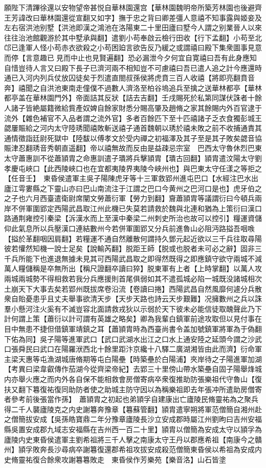 願陛下清蹕徐還以安物望帝甚悦自華林園還宫【華林園魏明帝所築芳林園也後避齊王芳諱改曰華林園還從宣翻又如字】撫于忠之背曰卿差彊人意禧不知事露與姬妾及左右宿洪池别墅【洪池即漢之鴻池在洛陽東二十里田廬曰墅今人謂之别業晉人以來往往治池館觀游於其中墅承與翻】遣劉小苟奉啟云檢行田收【行下孟翻】小苟至北邙已逢軍人怪小苟赤衣欲殺之小苟困廹言欲告反乃緩之或謂禧曰殿下集衆圖事見意而停【言意趣已見而中止也見賢遍翻】恐必漏泄今夕何宜自寛禧曰吾有此身應知自惜豈待人言又曰殿下長子已濟河兩不相知豈不可慮禧曰吾已遣人追之計今應還時通已入河内列兵仗放囚徒矣于烈遣直閤叔孫侯將虎賁三百人收禧【將即亮翻賁音奔】禧聞之自洪池東南走僮僕不過數人濟洛至柏谷塢追兵至擒之送華林都亭【華林都亭盖在華林園門外】帝面詰其反狀【詰去吉翻】壬戌賜死於私第同謀伏誅者十餘人諸子皆絶屬籍微給貲產奴婢自餘家財悉分賜高肇及趙脩之家其餘賜内外百官逮于流外【雜色補官不入品者謂之流外官】多者百餘匹下至十匹禧諸子乏衣食獨彭城王勰屢賑給之河内太守陸琇聞禧敗斬送禧子通首魏朝以琇於禧未敗之前不收捕通責其通情徵詣廷尉死獄中【陸馛以傅孝文於受内禪之初福澤及其子至是其子敗矣勰音協賑津忍翻琇音秀朝直遥翻】帝以禧無故而反由是益疎忌宗室　巴西太守魯休烈巴東太守蕭惠訓不從蕭頴胄之命惠訓遣子璝將兵擊頴胄【璝古回翻】頴胄遣汶陽太守劉孝慶屯峽口【此西陵峽口也在宜都夷陵界夷陵今峽州也】與巴東太守任漾之等拒之【任音壬】　東昏侯遣軍主吳子陽陳虎牙等十三軍救郢州進屯巴口【水經注巴水出廬江雩婁縣之下靈山亦曰巴山南流注于江謂之巴口今黄州之巴河口是也】虎牙伯之之子也六月西臺遣衛尉席闡文勞蕭衍軍【勞力到翻】齎蕭頴胄等議謂衍曰今頓兵兩岸不併軍圍郢定西陽武昌取江州此機已失莫若請救於魏與北連和猶為上策衍曰漢口路通荆雍控引秦梁【泝漢水而上至漢中秦梁二州刺史所治也故可以控引】糧運資儲仰此氣息所以兵壓漢口連結數州今若併軍圍郢又分兵前進魯山必阻沔路搤吾咽㗋【搤於革翻咽因肩翻】若糧運不通自然離散何謂持久鄧元起近欲以三千兵往取尋陽彼若懽然知機一說士足矣【說輸芮翻】脱距王師【脱或也脱者未可必之辭】固非三千兵所能下也進退無據未見其可西陽武昌取之即得然既得之即應鎮守欲守兩城不減萬人糧儲稱是卒無所出【稱尺證翻卒讀曰猝】脱東軍有上者【上時掌翻】以萬人攻兩城兩城勢不得相救若我分兵應援則首尾俱弱如其不遣孤城必陷一城既没諸城相次土崩天下大事去矣若郢州既拔席卷沿流【卷讀曰捲】西陽武昌自然風靡何遽分兵散衆自貽憂患乎且丈夫舉事欲清天步【天步天路也詩云天步艱難】况擁數州之兵以誅羣小懸河注火奚有不滅豈容北面請救戎狄以示弱於天下彼未必能信徒取醜聲此乃下計何謂上策【蕭衍以計可謂有英雄之略矣】卿為我輩白鎮軍前途攻取但以見付事在目中無患不捷但借鎮軍靖鎮之耳【蕭頴胄時為西臺尚書令盖加號鎮軍將軍為于偽翻下佑為同】吳子陽等進軍武口【武口武湖水出江之口水上通安陸之延頭今謂之沙武口張舜民曰武口在陽羅洑西北十餘里距汴京纔十八驛二廣湖湘皆由此而濟】衍命軍主梁天惠等屯漁湖城唐脩期等屯白陽壘【時築壘於白陽浦】夾岸待之子陽進軍加湖　【考異曰梁韋叡傳作茄湖今從齊梁帝紀】去郢三十里傍山帶水築壘自固子陽舉烽城内亦舉火應之而内外各自保不能相救會房僧寄病卒衆復推助防張樂祖代守魯山【復扶又翻下篹復祐復同助防者使之助城主防守因以為稱樂祖即去年張冲所遣助房僧寄者參考前後張當作孫】　蕭頴胄之初起也弟頴孚自建康出亡廬陵民脩靈祐為之聚兵得二千人襲廬陵克之内史謝篹奔豫章【篹蘇管翻】頴胄遣寧朔將軍范僧簡自湘州赴之僧簡拔安成【吳孫皓寶鼎二年分豫章廬陵長沙立安成郡時屬江州劉昫曰吉州安福縣吳置安成郡九域志安福縣在吉州西一百二十里】頴胄以僧簡為安成太守以頴孚為廬陵内史東昏侯遣軍主劉希祖將三千人擊之南康太守王丹以郡應希祖【南康今之贛州】頴孚敗奔長沙尋病卒謝篹復還郡希祖攻拔安成殺范僧簡東昏侯以希祖為安成内史脩靈祐復合餘衆攻謝篹篹敗走　東昏侯作芳樂苑【樂音洛】山石皆塗